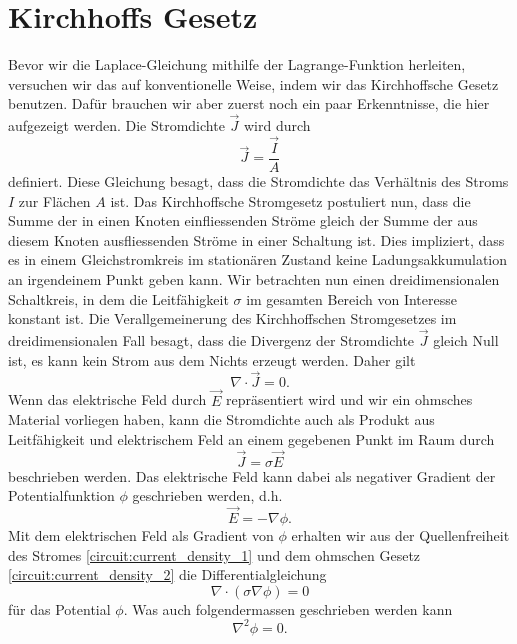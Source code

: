 %
%
%
%
\section{Kirchhoffs Gesetz
\label{circuit:section:teil1}}
Bevor wir die Laplace-Gleichung mithilfe der Lagrange-Funktion herleiten, versuchen wir das auf konventionelle Weise, indem wir  das Kirchhoffsche Gesetz benutzen. 
Dafür brauchen wir aber zuerst noch ein paar Erkenntnisse, die hier aufgezeigt werden. Die Stromdichte $\vec{J}$ wird durch
\begin{equation}
	\vec{J}=\frac{\vec{I}}{A}
	\label{circuit:current_density_3}
\end{equation}
definiert. Diese Gleichung besagt, dass die Stromdichte das Verhältnis des Stroms $I$ zur Flächen $A$ ist. 
Das Kirchhoffsche Stromgesetz postuliert nun, dass die Summe der in einen Knoten einfliessenden Ströme gleich der Summe der aus diesem Knoten ausfliessenden Ströme in einer Schaltung ist. Dies impliziert, dass es in einem Gleichstromkreis im stationären Zustand keine Ladungsakkumulation an irgendeinem Punkt geben kann. Wir betrachten nun einen dreidimensionalen Schaltkreis, in dem die Leitfähigkeit $\sigma$ im gesamten Bereich von Interesse konstant ist. Die Verallgemeinerung des Kirchhoffschen Stromgesetzes im dreidimensionalen Fall besagt, dass die Divergenz der Stromdichte $\vec{J}$ gleich Null ist, es kann kein Strom aus dem Nichts erzeugt werden. Daher gilt 
\begin{equation}
	\nabla \cdot  \vec{J}=0.
	\label{circuit:current_density_1}
\end{equation}
Wenn das elektrische Feld durch $\vec{E}$ repräsentiert wird und wir ein ohmsches Material vorliegen haben, kann die Stromdichte auch als Produkt aus Leitfähigkeit und elektrischem Feld an einem gegebenen Punkt im Raum durch 
\begin{equation}
\vec{J}=\sigma \vec{E}
\label{circuit:current_density_2}
\end{equation}
beschrieben werden.
Das elektrische Feld kann dabei als negativer Gradient der Potentialfunktion $\phi$ geschrieben werden, d.h.
\begin{equation}
\vec{E}=-\nabla \phi.
\label{circuit:current_density_4}
\end{equation}
Mit dem elektrischen Feld als Gradient von $\phi$ erhalten wir aus der Quellenfreiheit des Stromes \eqref{circuit:current_density_1} und dem ohmschen Gesetz \eqref{circuit:current_density_2} die Differentialgleichung 
\begin{equation}
	\nabla \cdot (\sigma \nabla \phi)=0
	\label{circuit:current_density_5}
\end{equation}
für das Potential $\phi$. Was auch folgendermassen geschrieben werden kann
\begin{equation}
\nabla^2 \phi=0.
\label{circuit:current_density_6}
\end{equation}

